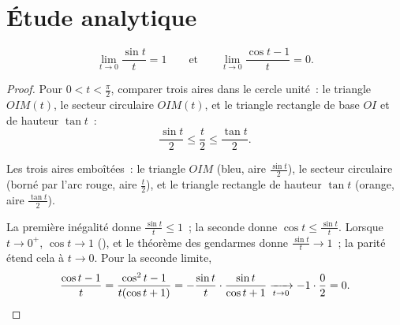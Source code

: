 \section{Étude analytique}

\begin{lemma}\label{lem:g12:trigo:sinxx}
\[
\lim_{t \to 0} \frac{\sin t}{t} = 1
\qquad\text{et}\qquad
\lim_{t \to 0} \frac{\cos t - 1}{t} = 0 .
\]
\end{lemma}

\begin{proof}
Pour $0 < t < \frac{\pi}{2}$, comparer trois aires dans le cercle unité~:
le triangle $OIM(t)$, le secteur circulaire $OIM(t)$, et le triangle
rectangle de base $OI$ et de hauteur $\tan t$~:
\[
\frac{\sin t}{2} \leq \frac{t}{2} \leq \frac{\tan t}{2}.
\]

\begin{omfigure}

{\small Les trois aires emboîtées~: le triangle $OIM$ (bleu, aire
$\frac{\sin t}{2}$), le secteur circulaire (borné par l'arc rouge, aire
$\frac{t}{2}$), et le triangle rectangle de hauteur $\tan t$ (orange,
aire $\frac{\tan t}{2}$).}
\end{omfigure}

La première inégalité donne $\frac{\sin t}{t} \leq 1$~; la seconde donne
$\cos t \leq \frac{\sin t}{t}$. Lorsque $t \to 0^+$, $\cos t \to 1$
(), et le théorème des gendarmes donne $\frac{\sin t}{t} \to 1$~;
la parité étend cela à $t \to 0$. Pour la seconde limite,
\[
\frac{\cos t - 1}{t} = \frac{\cos^2 t - 1}{t(\cos t + 1)}
= -\frac{\sin t}{t}\cdot\frac{\sin t}{\cos t + 1}
\xrightarrow[t\to0]{} -1 \cdot \frac{0}{2} = 0. \qedhere
\]
\end{proof}

